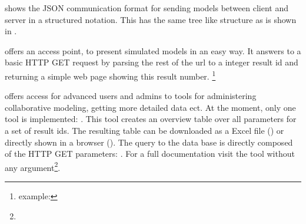 

 shows the JSON communication format for sending models between client and server in a structured notation. This has the same tree like structure as is shown in .


 offers an access point, to present simulated models in an easy way.
It answers to a basic HTTP GET request by parsing the rest of the url to a integer result id and returning a simple web page showing this result number.
\splurl[<result-id>]\footnote{example: \splurl[1337]}


 offers access for advanced users and admins to tools for administering collaborative modeling, getting more detailed data ect.
At the moment, only one tool is implemented: .
This tool creates an overview table over all parameters for a set of result ids.
The resulting table can be downloaded as a Excel file () or directly shown in a browser ().
The query to the data base is directly composed of the HTTP GET parameters:
\splurl[tools/ResultDataTable?6696,6904-7000\&type=html].
For a full documentation visit the tool without any argument\footnote{}.






